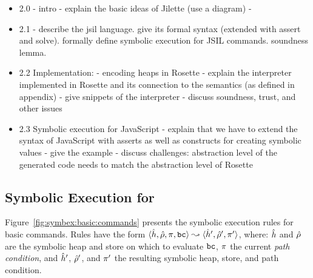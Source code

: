 
\begin{itemize}
  \item 2.0  - intro - explain the basic ideas of Jilette (use a diagram) - 
 
  \item 2.1 - describe the jsil language. give its formal syntax (extended with assert and solve). 
                   formally define symbolic execution for JSIL commands. soundness lemma. 
 
  \item 2.2 Implementation:  
               - encoding \jsil heaps in Rosette 
               - explain the \jsil interpreter implemented in Rosette and its connection to the \jsil semantics (as defined in appendix) 
               - give snippets of the interpreter 
               - discuss soundness, trust, and other issues
 
  \item 2.3 Symbolic execution for JavaScript 
              - explain that we have to extend the syntax of JavaScript with asserts  as well as constructs for creating symbolic values
              - give the example 
              - discuss challenges: abstraction level of the generated code needs to match the abstraction level of Rosette 
\end{itemize}

\subsection{Symbolic Execution for  \jsil}


Figure~\ref{fig:symbex:basic:commands} presents the symbolic execution rules for \jsil basic commands. 
Rules have the form $\langle \hat{h}, \hat\rho, \pi, \mathtt{bc} \rangle \leadsto \langle \hat{h}', \hat\rho', \pi' \rangle$, 
where:  $\hat{h}$ and $\hat\rho$ are the symbolic heap and store on which to evaluate $\mathtt{bc}$, 
 $\pi$ the current \emph{path condition}, and  $\hat{h}'$, $\hat\rho'$, and $\pi'$
the resulting symbolic heap, store, and path condition. 

